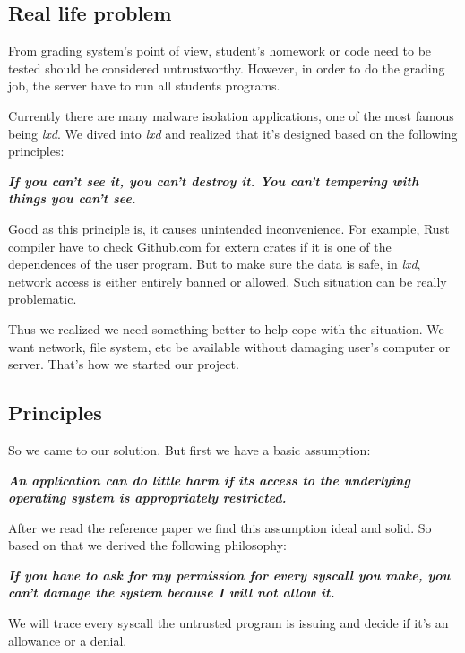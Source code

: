 \documentclass[conference,compsoc]{IEEEtran}
\begin{document}
	\subsection{Real life problem}
		\par
			From grading system's point of view, student's homework or code need to be tested should be considered untrustworthy. 
			However, in order to do the grading job, the server have to run all students programs.
		\par
			Currently there are many malware isolation applications, one of the most famous being \emph{lxd}. 
			We dived into \emph{lxd} and realized that it's designed based on the following principles:
		\par 
			\emph{\textbf{
				If you can't see it, you can't destroy it. 
				You can't tempering with things you can't see.
			}}
		\par
			Good as this principle is, it causes unintended inconvenience. 
			For example, Rust compiler have to check Github.com for extern crates if it is one of the dependences of the user program. 
			But to make sure the data is safe, in \emph{lxd}, network access is either entirely banned or allowed.
			Such situation can be really problematic.
		\par
			Thus we realized we need something better to help cope with the situation. 
			We want network, file system, etc be available without damaging user's computer or server. 
			That's how we started our project.
		\subsection{Principles}
			\par
				So we came to our solution. 
				But first we have a basic assumption:
			\par
				\emph{\textbf{
					An application can do little harm if its access to the underlying operating system is appropriately restricted.\cite{SecSandBox}
				}}
			\par
				After we read the reference paper we find this assumption ideal and solid. 
				So based on that we derived the following philosophy:
			\par
				\emph{\textbf{
					If you have to ask for my permission for every syscall you make, you can't damage the system because I will not allow it.
				}}
			\par
				We will trace every syscall the untrusted program is issuing and decide if it's an allowance or a denial.
\end{document}
